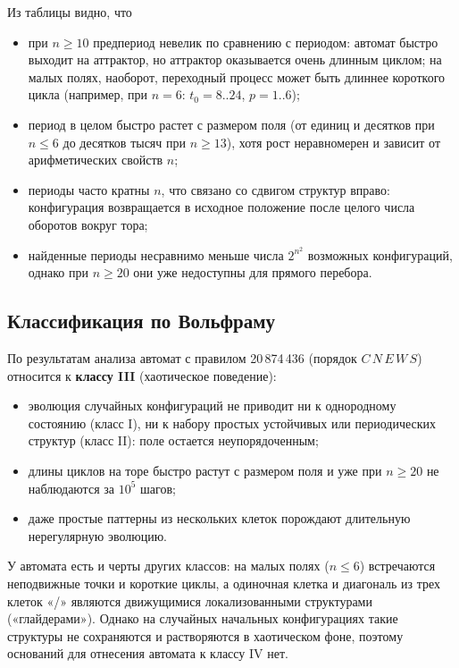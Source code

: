\documentclass[a4paper,14pt]{extarticle}
\begin{document}
Из таблицы видно, что
\begin{itemize}
	\item при $n \ge 10$ предпериод невелик по сравнению с периодом: автомат быстро выходит на аттрактор, но аттрактор оказывается очень длинным циклом; на малых полях, наоборот, переходный процесс может быть длиннее короткого цикла (например, при $n = 6$: $t_0 = 8..24$, $p = 1..6$);
	\item период в целом быстро растет с размером поля (от единиц и десятков при $n \le 6$ до десятков тысяч при $n \ge 13$), хотя рост неравномерен и зависит от арифметических свойств $n$;
	\item периоды часто кратны $n$, что связано со сдвигом структур вправо: конфигурация возвращается в исходное положение после целого числа оборотов вокруг тора;
	\item найденные периоды несравнимо меньше числа $2^{n^2}$ возможных конфигураций, однако при $n \ge 20$ они уже недоступны для прямого перебора.
\end{itemize}

\subsection{Классификация по Вольфраму}

По результатам анализа автомат с правилом 20\,874\,436 (порядок $C\,N\,E\,W\,S$) относится к \textbf{классу III} (хаотическое поведение):
\begin{itemize}
	\item эволюция случайных конфигураций не приводит ни к однородному состоянию (класс I), ни к набору простых устойчивых или периодических структур (класс II): поле остается неупорядоченным;
	\item длины циклов на торе быстро растут с размером поля и уже при $n \ge 20$ не наблюдаются за $10^5$ шагов;
	\item даже простые паттерны из нескольких клеток порождают длительную нерегулярную эволюцию.
\end{itemize}

У автомата есть и черты других классов: на малых полях ($n \le 6$) встречаются неподвижные точки и короткие циклы, а одиночная клетка и диагональ из трех клеток «/» являются движущимися локализованными структурами («глайдерами»). Однако на случайных начальных конфигурациях такие структуры не сохраняются и растворяются в хаотическом фоне, поэтому оснований для отнесения автомата к классу IV нет.

\newpage
\end{document}

